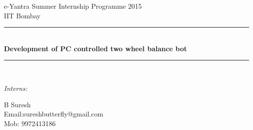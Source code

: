 \documentclass[report]{res}
\begin{document}
\begin{titlepage}

\newcommand{\HRule}{\rule{\linewidth}{0.5mm}} %

\center %
 
{\LARGE e-Yantra Summer Internship Programme 2015}\\[1.5cm] %
{\Large IIT Bombay}\\[1cm] %



\HRule \\[0.4cm]
{ \huge \bfseries Development of PC controlled two wheel balance bot}\\[0.4cm] %
\HRule \\[4cm]
 

\begin{minipage}{0.4\textwidth}
\begin{flushleft} \large
\emph{Interns: }\\
\end{flushleft}

\begin{flushleft}
{\large B Suresh} \\  Email:sureshbutterfly@gmail.com \\ Mob: 9972413186
\end{flushleft}


\end{minipage}
\end{titlepage}
\end{document}
